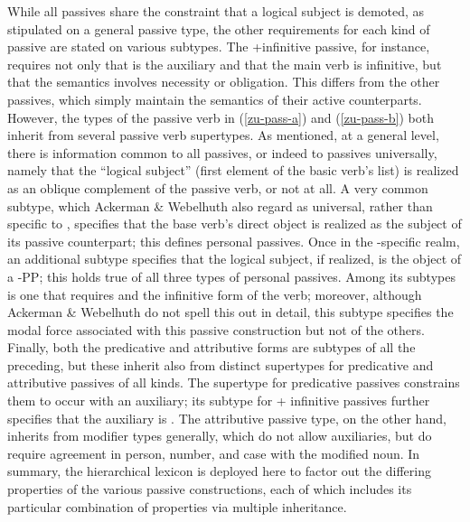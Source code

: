 \documentclass[output=paper
	        ,collection
	        ,collectionchapter
 	        ,biblatex
                ,babelshorthands
                ,newtxmath
                ,draftmode
                ,colorlinks, citecolor=brown
]{langscibook}
\begin{document}
While all passives share the constraint that a logical subject is demoted, as stipulated on a general  passive type, the other requirements for each kind of passive are stated on various subtypes.
The +infinitive passive, for instance, requires not only that  is the auxiliary and that the main verb is infinitive, but that the semantics involves necessity or obligation.
This differs from the other passives, which simply maintain the semantics of their active counterparts.
However, the types of the passive verb  in (\ref{zu-pass-a}) and (\ref{zu-pass-b}) both inherit from several passive verb supertypes.
As mentioned, at a general level, there is information common to all  passives, or indeed to passives universally, namely that the ``logical subject'' (first element of the basic verb's  list) is realized as an oblique complement of the passive verb, or not at all.
A very common subtype, which Ackerman \& Webelhuth also regard as universal, rather than specific to , specifies that the base verb's direct object is realized as the subject of its passive counterpart; this defines personal passives.
Once in the -specific realm, an additional subtype specifies that the logical subject, if realized, is the object of a -PP; this holds true of all three types of  personal passives.
Among its subtypes is one that requires  and the infinitive form of the verb; moreover, although Ackerman \& Webelhuth do not spell this out in detail, this subtype specifies the modal force associated with this passive construction but not of the others.
Finally, both the predicative and attributive forms are subtypes of all the preceding, but these inherit also from distinct supertypes for predicative and attributive passives of all kinds.
The supertype for predicative passives constrains them to occur with an auxiliary; its subtype for  + infinitive passives further specifies that the auxiliary is .
The attributive passive type, on the other hand, inherits from modifier types generally, which do not allow auxiliaries, but do require agreement in person, number, and case with the modified noun.
In summary, the hierarchical lexicon is deployed here to factor out the differing properties of the various  passive constructions, each of which includes its particular combination of properties via multiple inheritance.
\end{document}
